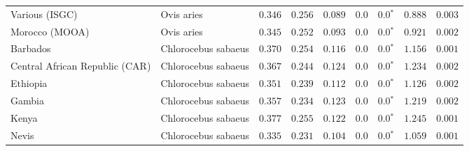 \begin{center}
\begin{adjustbox}{width = 1\textwidth}
\begin{tabular}{|l|l|r|r|r|r|r|r|r|}
                 Various (ISGC) &           Ovis aries &                                        $ 0.346$ &                                           $ 0.256$ &                      $ 0.089$ &            $0.0$ &                  $\bm{0.0{^*}}$ &                                           $ 0.888$ &           $ 0.003$ \\
                 Morocco (MOOA) &           Ovis aries &                                        $ 0.345$ &                                           $ 0.252$ &                      $ 0.093$ &            $0.0$ &                  $\bm{0.0{^*}}$ &                                           $ 0.921$ &           $ 0.002$ \\
                       Barbados &  Chlorocebus sabaeus &                                        $ 0.370$ &                                           $ 0.254$ &                      $ 0.116$ &            $0.0$ &                  $\bm{0.0{^*}}$ &                                           $ 1.156$ &           $ 0.001$ \\
 Central African Republic (CAR) &  Chlorocebus sabaeus &                                        $ 0.367$ &                                           $ 0.244$ &                      $ 0.124$ &            $0.0$ &                  $\bm{0.0{^*}}$ &                                           $ 1.234$ &           $ 0.002$ \\
                       Ethiopia &  Chlorocebus sabaeus &                                        $ 0.351$ &                                           $ 0.239$ &                      $ 0.112$ &            $0.0$ &                  $\bm{0.0{^*}}$ &                                           $ 1.126$ &           $ 0.002$ \\
                         Gambia &  Chlorocebus sabaeus &                                        $ 0.357$ &                                           $ 0.234$ &                      $ 0.123$ &            $0.0$ &                  $\bm{0.0{^*}}$ &                                           $ 1.219$ &           $ 0.002$ \\
                          Kenya &  Chlorocebus sabaeus &                                        $ 0.377$ &                                           $ 0.255$ &                      $ 0.122$ &            $0.0$ &                  $\bm{0.0{^*}}$ &                                           $ 1.245$ &           $ 0.001$ \\
                          Nevis &  Chlorocebus sabaeus &                                        $ 0.335$ &                                           $ 0.231$ &                      $ 0.104$ &            $0.0$ &                  $\bm{0.0{^*}}$ &                                           $ 1.059$ &           $ 0.001$ \\

\end{tabular}
\end{adjustbox}
\end{center}
